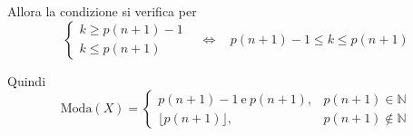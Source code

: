 \begin{enumerate}
Allora la condizione si verifica per\begin{equation*}
\begin{cases}
k\geq p( n+1) -1\\
k\leq p( n+1)
\end{cases} \ \ \ \ \iff \ \ \ \ p( n+1) -1\leq k\leq p( n+1)
\end{equation*}

Quindi\begin{equation*}
\text{Moda}( X) =\begin{cases}
p( n+1) -1\ \text{e} \ p( n+1) , & p( n+1) \in \mathbb{N}\\
\lfloor p( n+1)\rfloor , & p( n+1) \notin \mathbb{N}
\end{cases}
\end{equation*}
\end{enumerate}
\subsubsection{}

